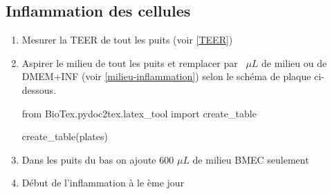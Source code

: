 \subsection{Inflammation des cellules}

\begin{enumerate}
\item Mesurer la TEER de tout les puits (voir \ref{TEER})
\item Aspirer le milieu de tout les puits et remplacer par ~$\mu L$ de milieu ou de DMEM+INF (voir \ref{milieu-inflammation}) selon le schéma de plaque ci-dessous.

\begin{pycode}
from BioTex.pydoc2tex.latex_tool import create_table

create_table(plates)
\end{pycode}

\item Dans les puits du bas on ajoute 600 $\mu L$ de milieu BMEC seulement
\item Début de l'inflammation à  le  ème jour
\end{enumerate}


